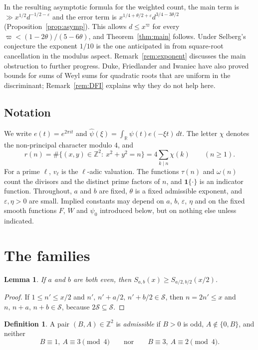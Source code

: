 \documentclass[11pt]{amsart}
\newtheorem{lemma}[theorem]{Lemma}
\theoremstyle{remark}
\theoremstyle{definition}
\newtheorem{definition}[theorem]{Definition}
\numberwithin{equation}{section}
\newcommand{\Sc}{\mathcal{S}}
\newcommand{\Z}{\mathbb{Z}}
\newcommand{\R}{\mathbb{R}}
\newcommand{\eps}{\varepsilon}
\newcommand{\one}{\mathbf{1}}
\begin{document}
In the resulting asymptotic formula for the weighted count, the main term is $\gg x^{1/2}d^{-1/2-\eps}$ and the error term is $x^{1/4+\theta/2+\eps}d^{3/4-3\theta/2}$ (Proposition~\ref{prop:asymp}). This allows $d\le x^{\varpi}$ for every $\varpi<(1-2\theta)/(5-6\theta)$, and Theorem~\ref{thm:main} follows. Under Selberg's conjecture the exponent $1/10$ is the one anticipated in \cite[Remark~8.1]{I} from square-root cancellation in the modulus aspect. Remark~\ref{rem:exponent} discusses the main obstruction to further progress. Duke, Friedlander and Iwaniec \cite{DFI12} have also proved bounds for sums of Weyl sums for quadratic roots that are uniform in the discriminant; Remark~\ref{rem:DFI} explains why they do not help here.

\subsection{Notation}
We write $e(t)=e^{2\pi it}$ and $\hat\psi(\xi)=\int_\R\psi(t)e(-\xi t)\,dt$. The letter $\chi$ denotes the non-principal character modulo $4$, and
\[
r(n)=\#\{(x,y)\in\Z^2:\ x^2+y^2=n\}=4\sum_{k\mid n}\chi(k)\qquad(n\ge1).
\]
For a prime $\ell$, $v_\ell$ is the $\ell$-adic valuation. The functions $\tau(n)$ and $\omega(n)$ count the divisors and the distinct prime factors of $n$, and $\one\{\cdot\}$ is an indicator function. Throughout, $a$ and $b$ are fixed, $\theta$ is a fixed admissible exponent, and $\eps,\eta>0$ are small. Implied constants may depend on $a$, $b$, $\eps$, $\eta$ and on the fixed smooth functions $F$, $W$ and $\psi_0$ introduced below, but on nothing else unless indicated.

\section{The families}\label{sec:families}

\begin{lemma}\label{lem:reduce}
If $a$ and $b$ are both even, then $S_{a,b}(x)\ge S_{a/2,b/2}(x/2)$.
\end{lemma}

\begin{proof}
If $1\le n'\le x/2$ and $n',\,n'+a/2,\,n'+b/2\in\Sc$, then $n=2n'\le x$ and $n,\,n+a,\,n+b\in\Sc$, because $2\Sc\subseteq\Sc$.
\end{proof}

\begin{definition}
A pair $(B,A)\in\Z^2$ is \emph{admissible} if $B>0$ is odd, $A\notin\{0,B\}$, and neither
\[
B\equiv1,\ A\equiv3\pmod 4\qquad\text{nor}\qquad B\equiv3,\ A\equiv2\pmod4.
\]
\end{definition}
\end{document}
